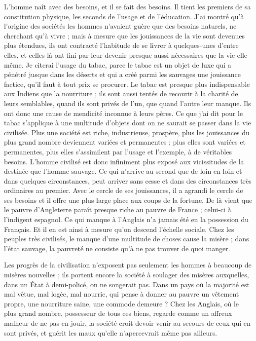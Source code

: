 \documentclass[french,twoside]{book} %
\begin{document}
\noindent L'homme naît avec des besoins, et il se fait des besoins. Il tient les premiers de sa constitution physique, les seconds de l’usage et de l’éducation. J'ai montré qu’à l’origine des sociétés les hommes n’avaient guère que des besoins naturels, ne cherchant qu’à vivre ; mais à mesure que les jouissances de la vie sont devenues plus étendues, ils ont contracté l’habitude de se livrer à quelques-unes d’entre elles, et celles-là ont fini par leur devenir presque aussi nécessaires que la vie elle-même. Je citerai l’usage du tabac, parce le tabac est un objet de luxe qui a pénétré jusque dans les déserts et qui a créé parmi les sauvages une jouissance factice, qu’il faut à tout prix se procurer. Le tabac est presque plus indispensable aux Indiens que la nourriture ; ils sont aussi tentés de recourir à la charité de leurs semblables, quand ils sont privés de l’un, que quand l’autre leur manque. Ils ont donc une cause de mendicité inconnue à leurs pères. Ce que j’ai dit pour le tabac s’applique à une multitude d’objets dont on ne saurait se passer dans la vie civilisée. Plus une société est riche, industrieuse, prospère, plus les jouissances du plus grand nombre deviennent variées et permanentes ; plus elles sont variées et permanentes, plus elles s’assimilent par l’usage et l’exemple, à de véritables besoins. L'homme civilisé est donc infiniment plus exposé aux vicissitudes de la destinée que l’homme sauvage. Ce qui n’arrive au second que de loin en loin et dans quelques circonstances, peut arriver sans cesse et dans des circonstances très ordinaires au premier. Avec le cercle de ses jouissances, il a agrandi le cercle de ses besoins et il offre une plus large place aux coups de la fortune. De là vient que le pauvre d’Angleterre paraît presque riche au pauvre de France ; celui-ci à l’indigent espagnol. Ce qui manque à l’Anglais n’a jamais été en la possession du Français. Et il en est ainsi à mesure qu’on descend l’échelle sociale. Chez les peuples très civilisés, le manque d’une multitude de choses cause la misère ; dans l’état sauvage, la pauvreté ne consiste qu’à ne pas trouver de quoi manger.\par
Les progrès de la civilisation n’exposent pas seulement les hommes à beaucoup de misères nouvelles ; ils portent encore la société à soulager des misères auxquelles, dans un État à demi-policé, on ne songerait pas. Dans un pays où la majorité est mal vêtue, mal logée, mal nourrie, qui pense à donner au pauvre un vêtement propre, une nourriture saine, une commode demeure ? Chez les Anglais, où le plus grand nombre, possesseur de tous ces biens, regarde comme un affreux malheur de ne pas en jouir, la société croit devoir venir au secours de ceux qui en sont privés, et guérit les maux qu’elle n’apercevrait même pas ailleurs.\par
\end{document}
